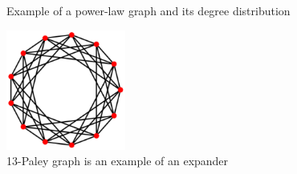 \begin{figure}
    \centering
    \qquad
    \caption{Example of a power-law graph and its degree distribution}
    \label{fig:power-law-graph-and-deg-distr}
\end{figure}

\begin{figure}
    \centering
    \includegraphics[width=0.35\textwidth]{images/paley}
    \caption{13-Paley graph is an example of an expander}
    \label{fig:paley-graph}
\end{figure}

